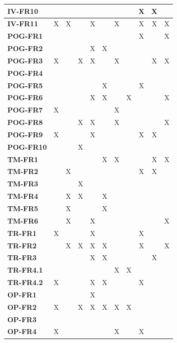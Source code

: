 \documentclass{article}
\begin{document}
\begin{table}[H]
\begin{adjustwidth}{-1in}{0in}
{\begin{tabular}{c|c|c|c|c|c|c|c|c|c|c|}
\multicolumn{1}{|l|}{\textbf{IV-FR10}} & & & & & & & & X & X & \\ \hline
\multicolumn{1}{|l|}{\textbf{IV-FR11}} & X & X & & X & & X & & X & X & X \\ \hline
\multicolumn{1}{|l|}{\textbf{POG-FR1}} & & & & & & & & X & & X \\ \hline
\multicolumn{1}{|l|}{\textbf{POG-FR2}} & & & & X & X & & & & & \\ \hline
\multicolumn{1}{|l|}{\textbf{POG-FR3}} & X & & X & X & & X & & & X & X \\ \hline
\multicolumn{1}{|l|}{\textbf{POG-FR4}} & & & & & & & & & & \\ \hline
\multicolumn{1}{|l|}{\textbf{POG-FR5}} & & & & & X & & & X & & \\ \hline
\multicolumn{1}{|l|}{\textbf{POG-FR6}} & & & & X & X & & X & & & X \\ \hline
\multicolumn{1}{|l|}{\textbf{POG-FR7}} & X & & & & & X & & & & \\ \hline
\multicolumn{1}{|l|}{\textbf{POG-FR8}} & & & X & X & & X & & & & X \\ \hline
\multicolumn{1}{|l|}{\textbf{POG-FR9}} & X & & & X & & & & X & X & \\ \hline
\multicolumn{1}{|l|}{\textbf{POG-FR10}} & & & X & & & & & & & \\ \hline
\multicolumn{1}{|l|}{\textbf{TM-FR1}} & & & & & X & X & & & X & X \\ \hline
\multicolumn{1}{|l|}{\textbf{TM-FR2}} & & X & & & & & & X & X & \\ \hline
\multicolumn{1}{|l|}{\textbf{TM-FR3}} & & & X & & & & & & & \\ \hline
\multicolumn{1}{|l|}{\textbf{TM-FR4}} & & X & X & & X & & & & & \\ \hline
\multicolumn{1}{|l|}{\textbf{TM-FR5}} & & X & & & X & & & & & \\ \hline
\multicolumn{1}{|l|}{\textbf{TM-FR6}} & & X & & X & & & & & & X \\ \hline
\multicolumn{1}{|l|}{\textbf{TR-FR1}} & X & & & X & & & & X & & \\ \hline
\multicolumn{1}{|l|}{\textbf{TR-FR2}} & & X & X & X & X & & & X & & X \\ \hline
\multicolumn{1}{|l|}{\textbf{TR-FR3}} & & & & X & X & & & & X & \\ \hline
\multicolumn{1}{|l|}{\textbf{TR-FR4.1}} & & & & & & X & X & & & \\ \hline
\multicolumn{1}{|l|}{\textbf{TR-FR4.2}} & X & & & X & X & & & X & & \\ \hline
\multicolumn{1}{|l|}{\textbf{OP-FR1}} & & & & X & & & & & & \\ \hline
\multicolumn{1}{|l|}{\textbf{OP-FR2}} & X & & X & X & X & X & X & & & \\ \hline
\multicolumn{1}{|l|}{\textbf{OP-FR3}} & & & & & & & & & & \\ \hline
\multicolumn{1}{|l|}{\textbf{OP-FR4}} & X & & & & & X & & X & & \\ \hline


\end{tabular}}
\end{adjustwidth}
\end{table}
\end{document}
